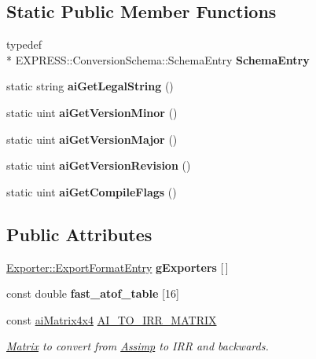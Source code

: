 \subsection*{Static Public Member Functions}
\begin{DoxyCompactItemize}
\item 
\hypertarget{class_assimp_a3a7bc7a2d4f4c00f3957c70240b8c03c}{typedef \\*
E\+X\+P\+R\+E\+S\+S\+::\+Conversion\+Schema\+::\+Schema\+Entry {\bfseries Schema\+Entry}}\label{class_assimp_a3a7bc7a2d4f4c00f3957c70240b8c03c}

\item 
\hypertarget{class_assimp_a591543ac6780f227ac94693d98f4b69a}{static string {\bfseries ai\+Get\+Legal\+String} ()}\label{class_assimp_a591543ac6780f227ac94693d98f4b69a}

\item 
\hypertarget{class_assimp_aef6f20e8bc0d4f2b5c94f9f2f65ba035}{static uint {\bfseries ai\+Get\+Version\+Minor} ()}\label{class_assimp_aef6f20e8bc0d4f2b5c94f9f2f65ba035}

\item 
\hypertarget{class_assimp_abf515a9279a125d6b6aac220bb0c01ea}{static uint {\bfseries ai\+Get\+Version\+Major} ()}\label{class_assimp_abf515a9279a125d6b6aac220bb0c01ea}

\item 
\hypertarget{class_assimp_a42ad146ad0815d94a6c0f1ef900eb703}{static uint {\bfseries ai\+Get\+Version\+Revision} ()}\label{class_assimp_a42ad146ad0815d94a6c0f1ef900eb703}

\item 
\hypertarget{class_assimp_a8979fb9feef3c9478b21a0d8fe1fa036}{static uint {\bfseries ai\+Get\+Compile\+Flags} ()}\label{class_assimp_a8979fb9feef3c9478b21a0d8fe1fa036}

\end{DoxyCompactItemize}
\subsection*{Public Attributes}
\begin{DoxyCompactItemize}
\item 
\hyperlink{struct_assimp_1_1_exporter_1_1_export_format_entry}{Exporter\+::\+Export\+Format\+Entry} {\bfseries g\+Exporters} \mbox{[}$\,$\mbox{]}
\item 
const double {\bfseries fast\+\_\+atof\+\_\+table} \mbox{[}16\mbox{]}
\item 
const \hyperlink{structai_matrix4x4}{ai\+Matrix4x4} \hyperlink{class_assimp_a19314eac9c9ac4063428dc825776156c}{A\+I\+\_\+\+T\+O\+\_\+\+I\+R\+R\+\_\+\+M\+A\+T\+R\+I\+X}
\begin{DoxyCompactList}\small\item\em \hyperlink{class_matrix}{Matrix} to convert from \hyperlink{class_assimp}{Assimp} to I\+R\+R and backwards. \end{DoxyCompactList}\end{DoxyCompactItemize}

